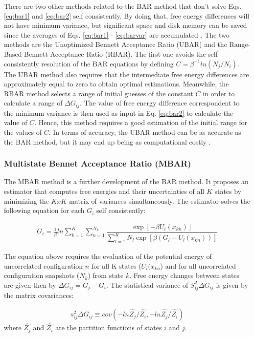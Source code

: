 There are two other methods related to the BAR method that don't solve Eqs. \eqref{eq:bar1} and \eqref{eq:bar2} self consistently. By doing that, free energy differences will not have minimum variance, but significant space and disk memory can be saved since the averages of Eqs. \eqref{eq:bar1} - \eqref{eq:barvar} are accumulated \cite{bareva}. The two methods are the Unoptimized Bennett Acceptance Ratio (UBAR) and the Range-Based Bennett Acceptance Ratio (RBAR). The first one avoids the self consistently resolution of the BAR equations by defining $C=\beta^{-1}ln(N_{j}/N_{i})$. The UBAR method also requires that the intermediate free energy differences are approximately equal to zero to obtain optimal estimations. Meanwhile, the RBAR method selects a range of initial guesses of the constant $C$ in order to calculate a range  of $\Delta G_{ij}$. The value of free energy difference correspondent to the minimum variance is then used as input in Eq. \eqref{eq:bar2} to calculate the value of $C$. Hence, this method requires a good estimation of the initial range for the values of $C$. In terms of accuracy, the UBAR method can be as accurate as the BAR method, but it may end up being as computational costly \cite{bareva}.  

\subsubsection{Multistate Bennet Acceptance Ratio (MBAR)}

The MBAR method \cite{mbar} is a further development of the BAR method. It proposes an estimator that computes free energies and their uncertainties of all $K$ states  by minimizing the $KxK$ matrix of variances simultaneously. The estimator solves the following equation for each $G_{i}$ self consistently:

\begin{equation}
\label{eq:mbar}
\begin{aligned}
G_{i} = \frac{1}{\beta}ln \sum_{k=1}^{K} \sum_{n=1}^{N_{k}}
\dfrac{\exp[-\beta U_{i}(x_{kn})]}{\sum_{l=1}^{K} N_{l} \exp[\beta (G_{l} - U_{l}(x_{kn}))]}
\end{aligned}
\end{equation}

The equation above requires the evaluation of the potential energy  of uncorrelated configuration $n$ for all K states ($U_{i}(x_{kn}$) and for all uncorrelated configuration snapshots ($N_{k}$) from state $k$. Free energy changes between states are given then by $\Delta G_{ij} = G_{j} -  G_{i}$. The statistical variance of $S_{ij}^{2} \Delta G_{ij}$ is given by the matrix covariances:

\begin{equation}
\label{eq:varmbar}
\begin{aligned}
s_{ij}^{2} \Delta G_{ij} \equiv cov (-ln \hat{Z_{j}}/\hat{Z_{i}},-ln \hat{Z_{j}}/\hat{Z_{i}})
\end{aligned}
\end{equation}
where $\hat{Z_{j}}$ and $\hat{Z_{i}}$ are the partition functions of states $i$ and $j$. 
